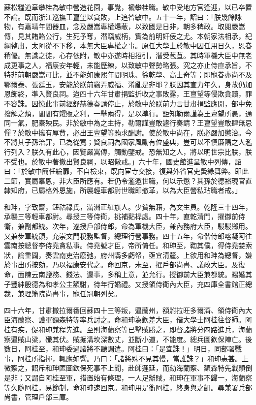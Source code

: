 \begin{pinyinscope}
蘇松糧道章攀桂為敏中營造花園，事覺，褫攀桂職。敏中受地方官逢迎，以已卒置不論。既而浙江巡撫王亶望以貪敗，上追咎敏中。五十一年，詔曰：「朕幾餘詠物，有嘉靖年間器皿，念及嚴嵩專權煬蔽，以致國是日非，朝多稗政。取閱嚴嵩傳，見其賄賂公行，生死予奪，潛竊威柄，實為前明奸佞之尤。本朝家法相承，紀綱整肅，太阿從不下移，本無大臣專權之事。原任大學士於敏中因任用日久，恩眷稍優。無識之徒，心存依附，敏中亦遂時相招引，潛受苞苴。其時軍機大臣中無老成更事之人，福康安年輕，未能歷練，以致敏中聲勢略張。究之亦止侍直承旨，不特非前朝嚴嵩可比，並不能如康熙年間明珠、徐乾學、高士奇等；即寵眷亦尚不及鄂爾泰、張廷玉，安能於朕前竊弄威福、淆亂是非耶？朕因其宣力年久，身故仍加恩飾終，準入賢良祠。迨四十六年甘肅捐監折收之事敗露，王亶望等侵欺貪黷，罪不容誅。因憶此事前經舒赫德奏請停止，於敏中於朕前力言甘肅捐監應開，部中免撥解之煩，閭閻有糶販之利，一舉兩得，是以準行。詎知勒爾謹為王亶望所愚，通同一氣，肥橐殃民。非於敏中為之主持，勒爾謹豈敢遽行奏請？王亶望豈敢肆無忌憚？於敏中擁有厚貲，必出王亶望等賄求酬謝。使於敏中尚在，朕必嚴加懲治。今不將其子孫治罪，已為從寬；賢良祠為國家風勵有位盛典，豈可以不慎廉隅之人濫行列入？朕久有此心，因覽嚴嵩傳，觸動鑒戒。恐無知之人，將以明世宗比朕，朕不受也。於敏中著撤出賢良祠，以昭儆戒。」六十年，國史館進呈敏中列傳，詔曰：「於敏中簡任綸扉，不自檢束，既向宦寺交接，復與外省官吏夤緣舞弊。即此二節，實屬辜恩，非大臣所應有。若仍令濫邀世職，何以示懲？其孫於德裕現官直隸知府，已屬格外恩施，所襲輕車都尉世職即撤革，以為大臣營私玷職者戒。」

和珅，字致齋，鈕祜祿氏，滿洲正紅旗人。少貧無藉，為文生員。乾隆三十四年，承襲三等輕車都尉。尋授三等侍衛，挑補黏桿處。四十年，直乾清門，擢御前侍衛，兼副都統。次年，遂授戶部侍郎，命為軍機大臣，兼內務府大臣，駸駸鄉用。又兼步軍統領，充崇文門稅務監督，總理行營事務。四十五年，命偕侍郎喀凝阿往雲南按總督李侍堯貪私事。侍堯號才臣，帝所倚任。和珅至，鞫其僕，得侍堯婪索狀，論重闢，奏雲南吏治廢弛，府州縣多虧帑，亟宜清釐。上欲用和珅為總督，嫌於事出所按劾，乃以福康安代之。命回京，未至，擢戶部尚書、議政大臣。及復命，面陳云南鹽務、錢法、邊事，多稱上意，並允行。授御前大臣兼都統。賜婚其子豐紳殷德為和孝公主額駙，待年行婚禮。又授領侍衛內大臣，充四庫全書館正總裁，兼理籓院尚書事，寵任冠朝列矣。

四十六年，甘肅撒拉爾番回蘇四十三等叛，逼蘭州，額駙拉旺多爾濟、領侍衛內大臣海蘭察、護軍額森特等率兵討之。命和珅為欽差大臣，偕大學士阿桂往督師。阿桂有疾，促和珅兼程先進。至則海蘭察等已擊賊勝之，即督諸將分四路進兵，海蘭察逼賊山梁，殲其伏。賊掘溝坎深數丈，並斷小道，不能度。總兵圖欽保陣亡。後數日，阿桂至，和珅委過諸將不聽調遣。阿桂曰：「是宜誅！」明日，同部署戰事，阿桂所指揮，輒應如響。乃曰：「諸將殊不見其慢，當誰誅？」和珅恚甚。上微察之，詔斥和珅匿圖欽保死事不上聞，赴師遲延，而劾海蘭察、額森特先戰顛倒是非；又謂自阿桂至軍，措置始有條理，一人足辦賊，和珅在軍事不歸一，海蘭察等久隨阿桂，易節制，命和珅速回京。和珅用是銜阿桂，終身與之齟。尋兼署兵部尚書，管理戶部三庫。


\end{pinyinscope}
